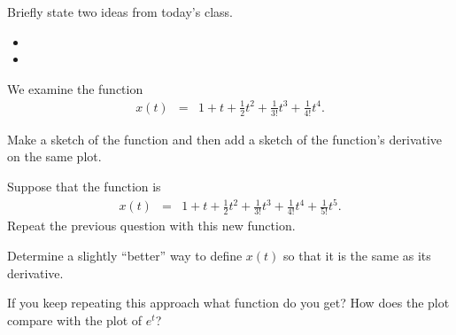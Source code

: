 \postClass

\begin{problem}
\item Briefly state two ideas from today's class.
  \begin{itemize}
  \item 
  \item 
  \end{itemize}
\item We examine the function
  \begin{eqnarray*}
    x(t) & = & 1 + t + \frac{1}{2} t^2 + \frac{1}{3!} t^3 + \frac{1}{4!} t^4.
  \end{eqnarray*}
  \begin{subproblem}
  \item Make a sketch of the function and then add a sketch of the
    function's derivative on the same plot.
    \vfill
  \item Suppose that the function is   
    \begin{eqnarray*}
      x(t) & = & 1 + t + \frac{1}{2} t^2 + \frac{1}{3!} t^3 +
                 \frac{1}{4!} t^4 + \frac{1}{5!} t^5.
    \end{eqnarray*}
    Repeat the previous question with this new function. 
    \vfill

    \clearpage
  \item Determine a slightly ``better'' way to define $x(t)$ so that
    it is the same as its derivative.  
    \vfill

  \item If you keep repeating this approach what function do you get?
    How does the plot compare with the plot of $e^t$?
    \vspace{2em}
  \end{subproblem}
\end{problem}


